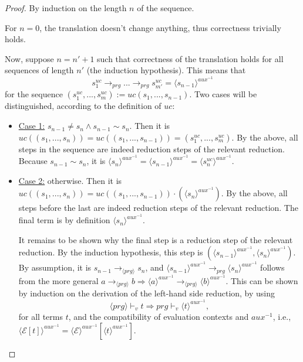 \correctb*
\begin{proof}
By induction on the length $n$ of the sequence.

For $n = 0$, the translation doesn't change anything, thus correctness trivially holds.

Now, suppose $n = n' + 1$ such that correctness of the translation holds for all sequences of length $n'$ (the induction hypothesis). This means that
\[
s^{uc}_1 \longrightarrow_{prg} ... \longrightarrow_{prg} s^{uc}_{m'} = \langle s_{n-1} \rangle^{aux^{-1}}
\]
for the sequence $(s^{uc}_1, ..., s^{uc}_m) := uc(s_1, ..., s_{n-1})$. Two cases will be distinguished, according to the definition of $uc$:
\begin{itemize}
\item \underline{Case 1:} $s_{n-1} \neq s_n \land s_{n-1} \sim s_n$.
Then it is $uc((s_1, ..., s_n)) = uc((s_1, ..., s_{n-1})) = (s^{uc}_1, ..., s^{uc}_m)$. By the above, all steps in the sequence are indeed reduction steps of the relevant reduction. Because $s_{n-1} \sim s_n$, it is $\langle s_n \rangle^{aux^{-1}} = \langle s_{n-1} \rangle^{aux^{-1}} = \langle s^{uc}_n \rangle^{aux^{-1}}$.

\item \underline{Case 2:} otherwise.
Then it is $uc((s_1, ..., s_n)) = uc((s_1, ..., s_{n-1})) \cdot (\langle s_n \rangle^{aux^{-1}})$. By the above, all steps before the last are indeed reduction steps of the relevant reduction. The final term is by definition $\langle s_n \rangle^{aux^{-1}}$.

It remains to be shown why the final step is a reduction step of the relevant reduction. By the induction hypothesis, this step is $(\langle s_{n-1} \rangle^{aux^{-1}}, \langle s_n \rangle^{aux^{-1}})$. By assumption, it is $s_{n-1} \longrightarrow_{\langle prg \rangle} s_n$, and $\langle s_{n-1} \rangle^{aux^{-1}} \longrightarrow_{prg} \langle s_n \rangle^{aux^{-1}}$ follows from the more general $a \longrightarrow_{\langle prg \rangle} b \Rightarrow \langle a \rangle^{aux^{-1}} \longrightarrow_{\langle prg \rangle} \langle b \rangle^{aux^{-1}}$. This can be shown by induction on the derivation of the left-hand side reduction, by using
\[
\langle prg \rangle \vdash_v t \Rightarrow prg \vdash_v \langle t \rangle^{aux^{-1}},
\]
for all terms $t$, and the compatibility of evaluation contexts and $aux^{-1}$, i.e., $\langle \mathcal{E}[t] \rangle^{aux^{-1}} = \langle \mathcal{E} \rangle^{aux^{-1}}[\langle t \rangle^{aux^{-1}}]$.

\end{itemize}
\end{proof}

\clearpage
\newpage
